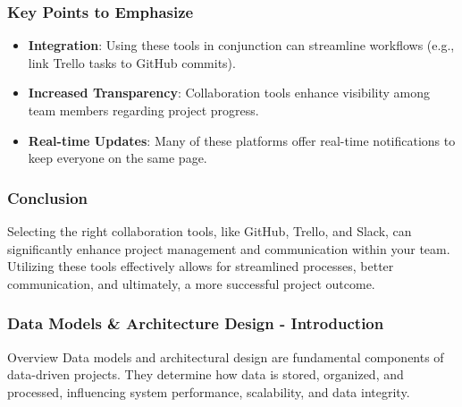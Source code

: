 \documentclass[aspectratio=169]{beamer}
\begin{document}
\begin{frame}[fragile]
    \frametitle{Key Points to Emphasize}
    \begin{itemize}
        \item \textbf{Integration}: Using these tools in conjunction can streamline workflows (e.g., link Trello tasks to GitHub commits).
        \item \textbf{Increased Transparency}: Collaboration tools enhance visibility among team members regarding project progress.
        \item \textbf{Real-time Updates}: Many of these platforms offer real-time notifications to keep everyone on the same page.
    \end{itemize}
\end{frame}

\begin{frame}[fragile]
    \frametitle{Conclusion}
    Selecting the right collaboration tools, like GitHub, Trello, and Slack, can significantly enhance project management and communication within your team. 
    Utilizing these tools effectively allows for streamlined processes, better communication, and ultimately, a more successful project outcome.
\end{frame}

\begin{frame}[fragile]
    \frametitle{Data Models \& Architecture Design - Introduction}
    \begin{block}{Overview}
        Data models and architectural design are fundamental components of data-driven projects. They determine how data is stored, organized, and processed, influencing system performance, scalability, and data integrity.
    \end{block}
\end{frame}
\end{document}
